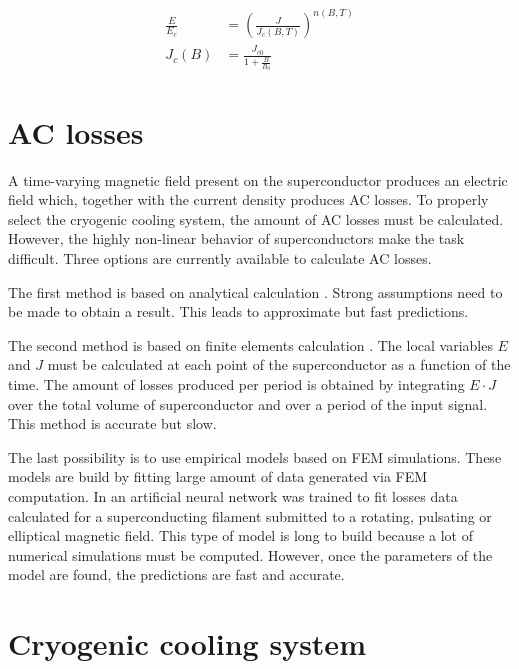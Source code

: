 \documentclass{ws-jmrr}
\begin{document}
\begin{multicols}{2}
\begin{align}
\frac{E}{E_c}&=\left (\frac{J}{J_c(B,T)}  \right )^{n(B,T)}
\label{powerlaw}\\
J_c(B)&=\frac{J_{c0}}{1+\frac{B}{B_0}}
\label{model1}
\end{align}

\section{AC losses}
\label{ac}
A time-varying magnetic field present on the superconductor produces an electric field which, together with the current density produces AC losses. To properly select the cryogenic cooling system, the amount of AC losses must be calculated. However, the highly non-linear behavior of superconductors make the task difficult. Three options are currently available to calculate AC losses.\par
The first method is based on analytical calculation \cite{0022-3727-3-4-308}. Strong assumptions need to be made to obtain a result. This leads to approximate but fast predictions.\par
The second method is based on finite elements calculation \cite{brambilla2006development}. The local variables $E$ and $J$ must be calculated at each point of the superconductor as a function of the time. The amount of losses produced per period is obtained by integrating $E\cdot J$ over the total volume of superconductor and over a period of the input signal. This method is accurate but slow.\par
The last possibility is to use empirical models based on FEM simulations. These models are build by fitting large amount of data generated via FEM computation. In \cite{leclerc2016artificial} an artificial neural network was trained to fit losses data calculated for a superconducting filament submitted to a rotating, pulsating or elliptical magnetic field. This type of model is long to build because a lot of numerical simulations must be computed. However, once the parameters of the model are found, the predictions are fast and accurate.

\section{Cryogenic cooling system}


\end{multicols}
\end{document}
